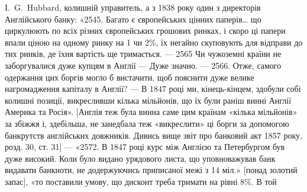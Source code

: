 I.~G.~Hubbard, колишній управитель, а з 1838 року один з директорів
Англійського банку: «2545. Багато є європейських цінних паперів\dots{} що циркулюють
по всіх різних європейських грошових ринках, і скоро ці папери впали
ціною на одному ринку на 1 чи 2\%, їх негайно скуповують для відправи до
тих ринків, де їхня вартість ще тримається. — 2565 Чи чужоземні країни не
заборгувалися дуже купцям в Англії — Дуже значно. — 2566. Отже, самого
одержання цих боргів могло б вистачити, щоб пояснити дуже велике нагромадження
капіталу в Англії? — В 1847 році ми, кінець-кінцем, здобули собі колишні
позиції, викресливши кілька мільйонів, що їх були раніш винні Англії
Америка та Росія». [Англія теж була винна саме цим країнам «кілька мільйонів» за
збіжжя і, здебільша, не занедбала теж «викреслити» ці борги за допомогою
банкрутств англійських довжників. Дивись вище звіт про банковий акт 1857 року,
розд. 30, ст. 31] — «2572. В 1847 році курс між Англією та Петербургом був
дуже високий. Коли було видано урядового листа, що уповноважував банк видавати
банкноти, не додержуючись приписаної межі з 14 міл.» [понад золотий
запас], «то поставили умову, що дисконт треба тримати на рівні 8\%. В той
\parbreak{}  %
